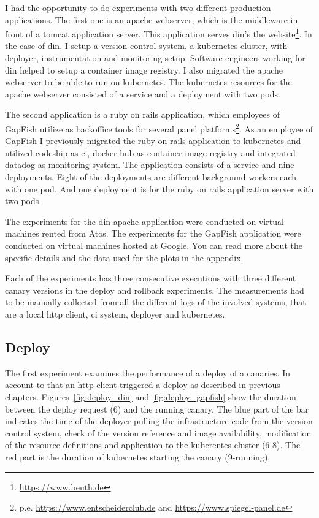 I had the opportunity to do experiments with two different production applications. The
first one is an apache webserver, which is the middleware in front of a tomcat application
server. This application serves \gls{din}'s the website\footnote{\url{https://www.beuth.de}}. In
the case of \gls{din}, I setup a version control system, a kubernetes cluster, with deployer,
instrumentation and monitoring setup. Software engineers working for \gls{din} helped to
setup a container image registry. I also migrated the apache webserver to be able to run
on kubernetes. The kubernetes resources for the apache webserver consisted of a service
and a deployment with two pods.

The second application is a ruby on rails application, which employees of GapFish utilize
as backoffice tools for several panel
platforms\footnote{p.e. \url{https://www.entscheiderclub.de} and
  \url{https://www.spiegel-panel.de}}. As an employee of GapFish I previously migrated the
ruby on rails application to kubernetes and utilized codeship as \gls{ci}, docker hub as
container image registry and integrated datadog as monitoring system. The application
consists of a service and nine deployments. Eight of the deployments are different
background workers each with one pod. And one deployment is for the ruby on rails
application server with two pods.

The experiments for the \gls{din} apache application were conducted on virtual machines rented
from Atos. The experiments for the GapFish application were conducted on virtual machines
hosted at Google. You can read more about the specific details and the data used for the
plots in the appendix.

Each of the experiments has three consecutive executions with three different canary
versions in the deploy and rollback experiments. The measurements had to be manually
collected from all the different logs of the involved systems, that are a local http
client, \gls{ci} system, deployer and kubernetes.

\subsection{Deploy}

The first experiment examines the performance of a deploy of a canaries. In account to
that an http client triggered a deploy as described in previous
chapters. Figures~\ref{fig:deploy_din} and \ref{fig:deploy_gapfish} show the duration
between the deploy request (6) and the running canary. The blue part of the bar indicates
the time of the deployer pulling the infrastructure code from the version control system,
check of the version reference and image availability, modification of the resource
definitions and application to the kuberentes cluster (6-8). The red part is the duration
of kubernetes starting the canary (9-running).

